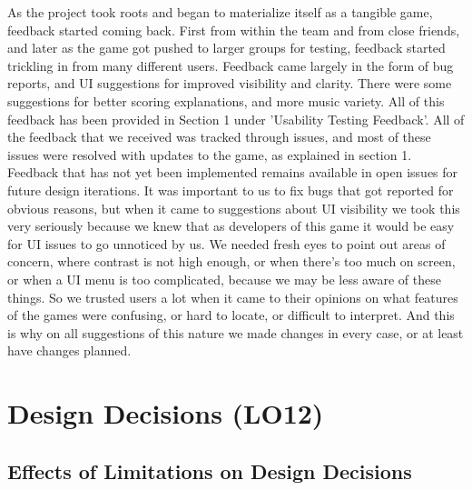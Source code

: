 \documentclass{article}
\begin{document}
As the project took roots and began to materialize itself as a tangible game, feedback started coming back. First from within the team and from close friends, and later as the game got pushed to larger groups for testing, feedback started trickling in from many different users. Feedback came largely in the form of bug reports, and UI suggestions for improved visibility and clarity. There were some suggestions for better scoring explanations, and more music variety. All of this feedback has been provided in Section 1 under 'Usability Testing Feedback'. All of the feedback that we received was tracked through issues, and most of these issues were resolved with updates to the game, as explained in section 1. Feedback that has not yet been implemented remains available in open issues for future design iterations. It was important to us to fix bugs that got reported for obvious reasons, but when it came to suggestions about UI visibility we took this very seriously because we knew that as developers of this game it would be easy for UI issues to go unnoticed by us. We needed fresh eyes to point out areas of concern, where contrast is not high enough, or when there's too much on screen, or when a UI menu is too complicated, because we may be less aware of these things. So we trusted users a lot when it came to their opinions on what features of the games were confusing, or hard to locate, or difficult to interpret. And this is why on all suggestions of this nature we made changes in every case, or at least have changes planned.

\section{Design Decisions (LO12)}

\subsection{Effects of Limitations on Design Decisions}
\end{document}
